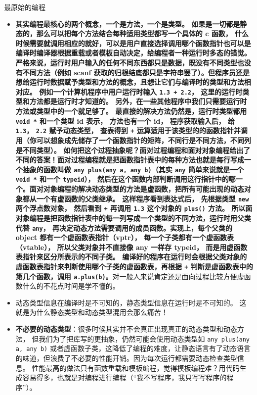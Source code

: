 
\begin{issues}
\issueDraft
\end{issues}

最原始的编程
\begin{itemize}
\item \textbf{其实编程最核心的两个概念，一个是\textbf{方法}，一个是\textbf{类型}。 如果是一切都是静态的，那么可以把每个方法结合每种适用类型都写一个具体的 c 函数， 什么时候需要就调用相应的就好，可以是用户直接选择调用哪个函数指针也可以是编译时编译器根据重载或者模板自动决定，给编程者一种运行时多态的错觉。 严格来说，运行时用户输入的任何不同东西都只是数据，既没有不同类型也没有不同方法（例如 scanf 获取的归根结底都只是字符串罢了）。但程序员还是想给运行时数据赋予类型和方法的概念，且想让它们与编译时的类型和方法相对应。 例如一个计算机程序中用户运行时输入 \verb`1.3 + 2.2`， 这里的运行时类型和方法都是运行时才知道的。 另外，在一些其他程序中我们只需要运行时方法或类型中的一个就足够了。 最直接的解决方法仍然是，运行时类型都用 \verb`void *` 和一个类型 id 表示， 方法也有一个 id， 程序获取输入后， 给 \verb`1.3`， \verb`2.2` 赋予动态类型， 查表得到 \verb`+` 运算适用于该类型的的函数指针并调用（你可以想象成先储存了一个函数指针的矩阵，不同行是不同方法，不同列是不同类型）。 如何把这个过程抽象呢？面对过程编程和面对对象编程给出了不同的答案！面对过程编程就是把函数指针表中的每种方法也就是每行写成一个抽象的函数叫做 \verb`any plus(any a, any b)`（其实 \verb`any` 简单来说就是一个 \verb`void *` 和一个 \verb`typeid`）， 然后在这个函数内部判断调用这行指针中的哪一个。面对对象编程的解决动态类型的方法是虚函数，把所有可能出现的动态对象都从一个有虚函数的父类继承。 这样程序看到表达式后， 先根据类型 \verb`new` 两个浮点数对象， 然后看到 \verb`+` 再调用 \verb`1.3` 这个对象的 \verb`plus()` 方法。 所以面对象编程是把函数指针表中的每一列写成一个类型的不同方法，运行时用父类代替 \verb`any`， 再决定动态方法需要调用的成员函数。实现上，每个父类的 object 都有一个\textbf{虚函数表指针（vptr）}， 每一个子类都有一个\textbf{虚函数表（vtable）}， 所以父类对象并不直接像 any 一样存 typeid， 而是用虚函数表指针来区分所表示的不同子类。 编译好的程序在运行时会根据父类对象的虚函数表指针来判断使用哪个子类的虚函数表，再根据 \verb`+` 判断是虚函数表中的第几个函数，调用 \verb`a.plus(b)`。}对一般人来说肯定还是面向过程比较方便虚函数什么的不花点时间是学不懂的。
\item 动态类型信息在编译时是不可知的，静态类型信息在运行时是不可知的。 这就是为什么静态类型和动态类型混用会那么痛苦！
\item \textbf{不必要的动态类型}：很多时候其实并不会真正出现真正的动态类型和动态方法， 但我们为了把库写的更抽象，仍然可能会使用动态类型如 \verb`any plus(any a, any b)` 或者虚函数子类，这降低了编程的难度，让静态语言有了动态语言的味道，但浪费了不必要的性能开销。因为每次运行都需要动态检查类型信息。 性能最高的做法只有函数重载和模板编程，觉得模板编程难？用代码生成容易得多，也就是对编程进行编程（“我不写程序，我只写写程序的程序”）。

\end{itemize}
